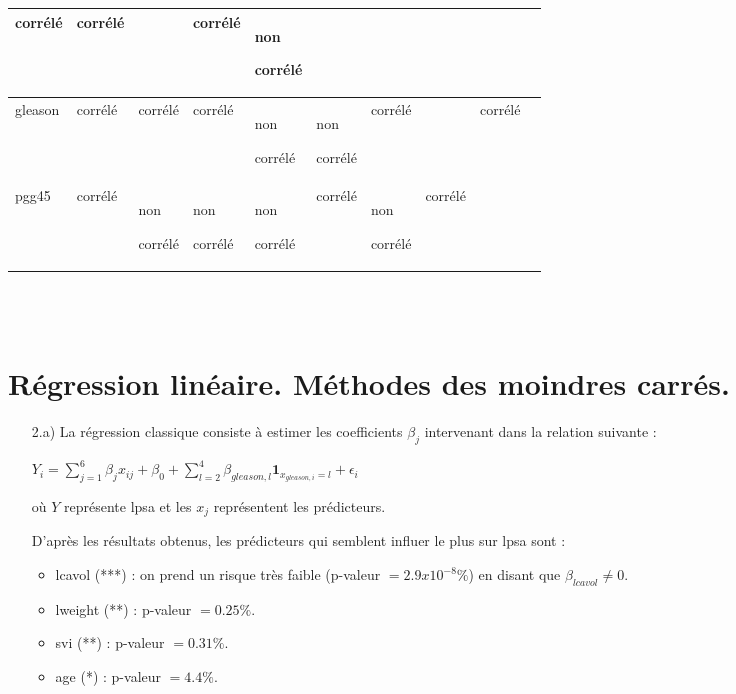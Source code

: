 \documentclass[a4paper, 12pt]{article}
\begin{document}
\begin{enumerate}
\begin{tabular}{|p{1.4cm}|p{1.4cm}|p{1.4cm}|p{1.4cm}|p{1.4cm}|p{1.4cm}|p{1.4cm}|p{1.4cm}|p{1.4cm}|p{1.4cm}|}
   corrélé & corrélé &  & corrélé & non

    corrélé \\
    \hline
    gleason & corrélé & corrélé & corrélé & non 

    corrélé & non 

    corrélé & corrélé & & corrélé \\
    \hline
    pgg45 & corrélé & non 

    corrélé & non 

    corrélé & non 

    corrélé & corrélé & non 

    corrélé & corrélé & \\
    \hline

\end{tabular}
\\\\
\end{enumerate}



\section{Régression linéaire. Méthodes des moindres carrés.}

\begin{enumerate}
\setlength{\itemsep}{20pt}
\item[2.a)]
La régression classique consiste à estimer les coefficients $\beta_{j}$ intervenant dans la relation suivante :

$ Y_{i} = \sum\limits_{j=1}^6 \beta_{j} x_{ij} + \beta_{0} + \sum\limits_{l=2}^4 \beta_{gleason, l} \mathbf{1}_{x_{gleason, i}=l} + \epsilon_{i} $

où $Y$ représente lpsa et les $x_{j}$ représentent les prédicteurs.  

D'après les résultats obtenus, les prédicteurs qui semblent influer le plus sur lpsa sont :
\begin{itemize}
\item lcavol (***) : on prend un risque très faible (p-valeur $=2.9x10^{-8}\%$) en disant que $\beta_{lcavol} \neq 0$.
\item lweight (**) : p-valeur $=0.25\%$.
\item svi (**) : p-valeur $=0.31\%$.
\item age (*) : p-valeur $=4.4\%$.
\end{itemize}




\end{enumerate}
\end{document}

